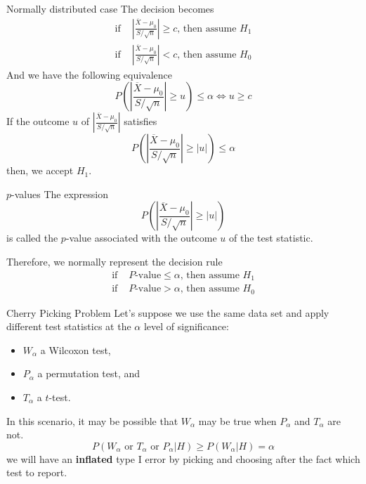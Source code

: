 \documentclass{beamer}
\begin{document}
\begin{frame}{Normally distributed case}
	The decision becomes
	\begin{equation*}
		\begin{split}
		\text{if }& |\frac{\overline{X}-\mu_0}{S/\sqrt{n}}| \ge c \text{, then assume }H_1\\
		\text{if }& |\frac{\overline{X}-\mu_0}{S/\sqrt{n}}| < c \text{, then assume }H_0
		\end{split}
	\end{equation*}
	And we have the following equivalence
	\begin{equation*}
		P(|\frac{\overline{X}-\mu_0}{S/\sqrt{n}}|\ge u)\le \alpha \iff u \ge c
	\end{equation*}
	If the outcome $u$ of $|\frac{\overline{X}-\mu_0}{S/\sqrt{n}}|$ satisfies 
	\begin{equation*}
		P(|\frac{\overline{X}-\mu_0}{S/\sqrt{n}}|\ge |u|)\le \alpha 
	\end{equation*}
	then, we accept $H_1$.
\end{frame}
\begin{frame}{$p$-values}
	The expression 
	\begin{equation*}
			P(|\frac{\overline{X}-\mu_0}{S/\sqrt{n}}|\ge |u|)
	\end{equation*}
	is called the $p$-value associated with the outcome $u$ of the test statistic.
	
	Therefore, we normally represent the decision rule
		\begin{equation*}
		\begin{split}
			\text{if }& P\text{-value} \le \alpha \text{, then assume }H_1\\
			\text{if }& P\text{-value} > \alpha \text{, then assume }H_0
		\end{split}
	\end{equation*}
\end{frame}

\begin{frame}{Cherry Picking Problem}
	Let's suppose we use the same data set and apply different test statistics at the $\alpha$ level of significance:
	\begin{itemize}
		\item $W_\alpha$ a Wilcoxon test,
		\item $P_\alpha$ a permutation test, and
		\item $T_\alpha$ a $t$-test.
	\end{itemize}
In this scenario, it may be possible that $W_\alpha$ may be true when $P_\alpha$ and $T_\alpha$ are not. 
\begin{equation*}
	P(W_\alpha \text{ or } T_\alpha \text{ or }P_\alpha| H) \ge P(W_\alpha|H) = \alpha
\end{equation*}
we will have an {\bf inflated} type I error by picking and choosing after the fact which test to report. 
\end{frame}
\end{document}
